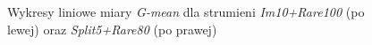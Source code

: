 \begin{figure}[h]
    \centering
    \qquad
    \caption{Wykresy liniowe miary \textit{G-mean} dla strumieni \textit{Im10+Rare100} (po lewej) oraz \textit{Split5+Rare80} (po prawej)}\label{Figure:PairsFactorsHNOB}
\end{figure}

